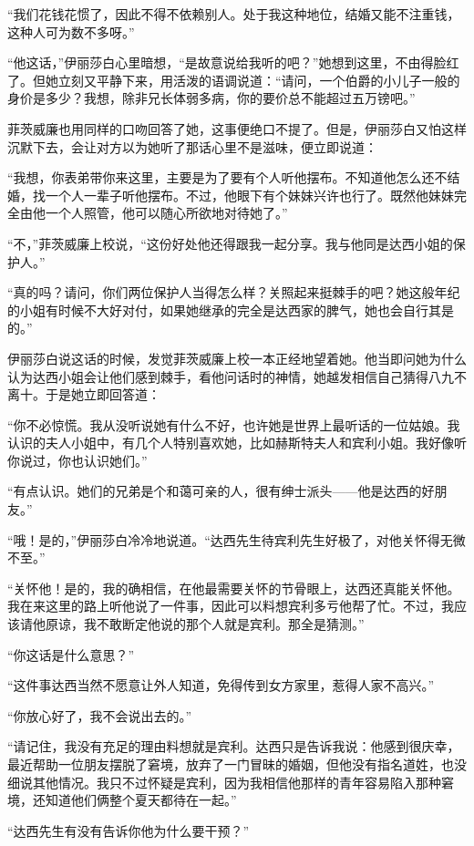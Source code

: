 \par “我们花钱花惯了，因此不得不依赖别人。处于我这种地位，结婚又能不注重钱，这种人可为数不多呀。”
\par “他这话，”伊丽莎白心里暗想，“是故意说给我听的吧？”她想到这里，不由得脸红了。但她立刻又平静下来，用活泼的语调说道：“请问，一个伯爵的小儿子一般的身价是多少？我想，除非兄长体弱多病，你的要价总不能超过五万镑吧。”
\par 菲茨威廉也用同样的口吻回答了她，这事便绝口不提了。但是，伊丽莎白又怕这样沉默下去，会让对方以为她听了那话心里不是滋味，便立即说道：
\par “我想，你表弟带你来这里，主要是为了要有个人听他摆布。不知道他怎么还不结婚，找一个人一辈子听他摆布。不过，他眼下有个妹妹兴许也行了。既然他妹妹完全由他一个人照管，他可以随心所欲地对待她了。”
\par “不，”菲茨威廉上校说，“这份好处他还得跟我一起分享。我与他同是达西小姐的保护人。”
\par “真的吗？请问，你们两位保护人当得怎么样？关照起来挺棘手的吧？她这般年纪的小姐有时候不大好对付，如果她继承的完全是达西家的脾气，她也会自行其是的。”
\par 伊丽莎白说这话的时候，发觉菲茨威廉上校一本正经地望着她。他当即问她为什么认为达西小姐会让他们感到棘手，看他问话时的神情，她越发相信自己猜得八九不离十。于是她立即回答道：
\par “你不必惊慌。我从没听说她有什么不好，也许她是世界上最听话的一位姑娘。我认识的夫人小姐中，有几个人特别喜欢她，比如赫斯特夫人和宾利小姐。我好像听你说过，你也认识她们。”
\par “有点认识。她们的兄弟是个和蔼可亲的人，很有绅士派头——他是达西的好朋友。”
\par “哦！是的，”伊丽莎白冷冷地说道。“达西先生待宾利先生好极了，对他关怀得无微不至。”
\par “关怀他！是的，我的确相信，在他最需要关怀的节骨眼上，达西还真能关怀他。我在来这里的路上听他说了一件事，因此可以料想宾利多亏他帮了忙。不过，我应该请他原谅，我不敢断定他说的那个人就是宾利。那全是猜测。”
\par “你这话是什么意思？”
\par “这件事达西当然不愿意让外人知道，免得传到女方家里，惹得人家不高兴。”
\par “你放心好了，我不会说出去的。”
\par “请记住，我没有充足的理由料想就是宾利。达西只是告诉我说：他感到很庆幸，最近帮助一位朋友摆脱了窘境，放弃了一门冒昧的婚姻，但他没有指名道姓，也没细说其他情况。我只不过怀疑是宾利，因为我相信他那样的青年容易陷入那种窘境，还知道他们俩整个夏天都待在一起。”
\par “达西先生有没有告诉你他为什么要干预？”
